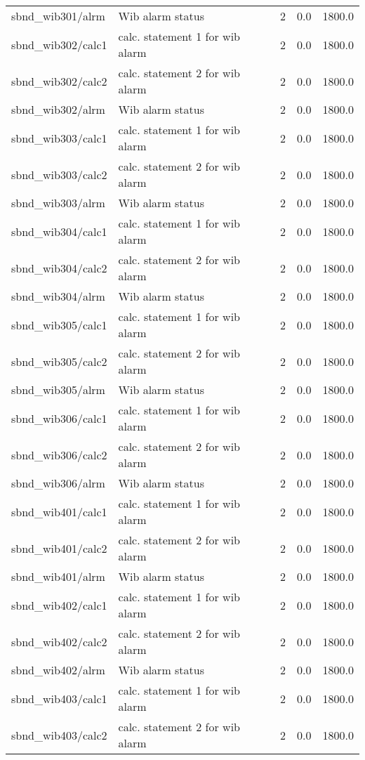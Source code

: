 \begin{center}
\begin{longtable}{l | l l l l }
sbnd\_wib301/alrm & Wib alarm status & 2 & 0.0 & 1800.0\\ 
sbnd\_wib302/calc1 & calc. statement 1 for wib alarm & 2 & 0.0 & 1800.0\\ 
sbnd\_wib302/calc2 & calc. statement 2 for wib alarm & 2 & 0.0 & 1800.0\\ 
sbnd\_wib302/alrm & Wib alarm status & 2 & 0.0 & 1800.0\\ 
sbnd\_wib303/calc1 & calc. statement 1 for wib alarm & 2 & 0.0 & 1800.0\\ 
sbnd\_wib303/calc2 & calc. statement 2 for wib alarm & 2 & 0.0 & 1800.0\\ 
sbnd\_wib303/alrm & Wib alarm status & 2 & 0.0 & 1800.0\\ 
sbnd\_wib304/calc1 & calc. statement 1 for wib alarm & 2 & 0.0 & 1800.0\\ 
sbnd\_wib304/calc2 & calc. statement 2 for wib alarm & 2 & 0.0 & 1800.0\\ 
sbnd\_wib304/alrm & Wib alarm status & 2 & 0.0 & 1800.0\\ 
sbnd\_wib305/calc1 & calc. statement 1 for wib alarm & 2 & 0.0 & 1800.0\\ 
sbnd\_wib305/calc2 & calc. statement 2 for wib alarm & 2 & 0.0 & 1800.0\\ 
sbnd\_wib305/alrm & Wib alarm status & 2 & 0.0 & 1800.0\\ 
sbnd\_wib306/calc1 & calc. statement 1 for wib alarm & 2 & 0.0 & 1800.0\\ 
sbnd\_wib306/calc2 & calc. statement 2 for wib alarm & 2 & 0.0 & 1800.0\\ 
sbnd\_wib306/alrm & Wib alarm status & 2 & 0.0 & 1800.0\\ 
sbnd\_wib401/calc1 & calc. statement 1 for wib alarm & 2 & 0.0 & 1800.0\\ 
sbnd\_wib401/calc2 & calc. statement 2 for wib alarm & 2 & 0.0 & 1800.0\\ 
sbnd\_wib401/alrm & Wib alarm status & 2 & 0.0 & 1800.0\\ 
sbnd\_wib402/calc1 & calc. statement 1 for wib alarm & 2 & 0.0 & 1800.0\\ 
sbnd\_wib402/calc2 & calc. statement 2 for wib alarm & 2 & 0.0 & 1800.0\\ 
sbnd\_wib402/alrm & Wib alarm status & 2 & 0.0 & 1800.0\\ 
sbnd\_wib403/calc1 & calc. statement 1 for wib alarm & 2 & 0.0 & 1800.0\\ 
sbnd\_wib403/calc2 & calc. statement 2 for wib alarm & 2 & 0.0 & 1800.0\\ 

\end{longtable}
\end{center}
